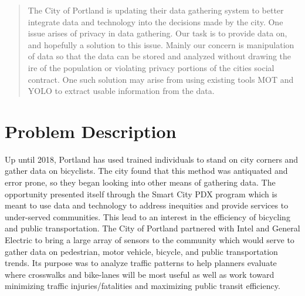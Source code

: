 \documentclass[journal,draftclsnofoot,onecolumn]{IEEEtran}
\begin{document}
    
    
    
    
    
    
    
    
    
    
    \maketitle
    
    \begin{abstract}
        The City of Portland is updating their data gathering system to better 
        integrate data and technology into the decisions made by the city. One 
        issue arises of privacy in data gathering. Our task is to provide data 
        on, and hopefully a solution to this issue. Mainly our concern is 
        manipulation of data so that the data can be stored and analyzed without
        drawing the ire of the population or violating privacy portions of the 
        cities social contract. One such solution may arise from using existing 
        tools MOT and YOLO to extract usable information from the data.
    \end{abstract}
    
    
    
    \section{Problem Description}

    Up until 2018, Portland has used trained individuals to stand on city corners 
    and gather data on bicyclists. The city found that this method was antiquated 
    and error prone, so they began looking into other means of gathering data. 
    The opportunity presented itself through the Smart City PDX program which is 
    meant to use data and technology to address inequities and provide services 
    to under-served communities. This lead to an interest in the efficiency of 
    bicycling and public transportation. The City of Portland partnered with 
    Intel and General Electric to bring a large array of sensors to the community 
    which would serve to gather data on pedestrian, motor vehicle, bicycle, and 
    public transportation trends. Its purpose was to analyze traffic patterns to 
    help planners evaluate where crosswalks and bike-lanes will be most useful as 
    well as work toward minimizing traffic injuries/fatalities and maximizing 
    public transit efficiency.
\end{document}
